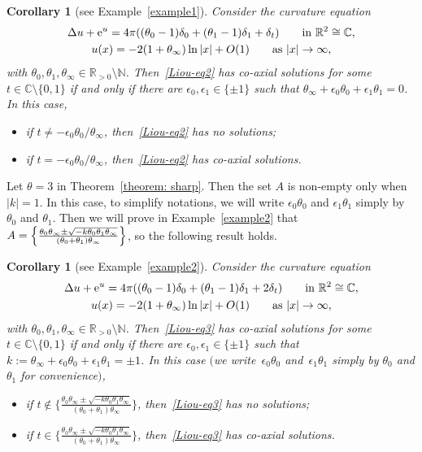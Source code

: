\documentclass[pdftex]{sigma}
\numberwithin{equation}{section}
\newtheorem{Corollary}[Theorem]{Corollary}
\def\C{\mathbb C}
\begin{document}
\begin{Corollary}[see Example~\ref{example1}]
Consider the curvature equation
\begin{gather}
 \Delta u+{\rm e}^u=4\pi((\theta_0-1)\delta_0+(\theta_1-1)\delta_1
 +\delta_{t})
 \qquad\text{in}\ \mathbb R^2\cong\C, \nonumber\\
 u(x)=-2(1+\theta_\infty)\ln|x|+O(1) \qquad \text{as} \
 |x|\to\infty, \label{Liou-eq2}
\end{gather}
with $\theta_0,\theta_1,\theta_\infty\in\mathbb{R}_{>0}\setminus \mathbb{N}$. Then~\eqref{Liou-eq2} has co-axial solutions for some $t\in\mathbb{C}\setminus\{0,1\}$ if and only if there are $\epsilon_0,\epsilon_1\in\{\pm1\}$ such that
 $\theta_\infty+\epsilon_0\theta_0+\epsilon_1\theta_1=0$. In this case,
 \begin{itemize}\itemsep=0pt
 \item[$1)$]if $t\neq -\epsilon_0\theta_0/\theta_\infty$, then~\eqref{Liou-eq2} has no solutions;
 \item[$2)$]if $t= -\epsilon_0\theta_0/\theta_\infty$, then~\eqref{Liou-eq2} has co-axial solutions.
 \end{itemize}
\end{Corollary}

Let $\theta=3$ in Theorem~\ref{theorem: sharp}. Then the set $A$ is non-empty
 only when $|k|=1$. In this case,
 to simplify notations, we will write $\epsilon_0\theta_0$ and
 $\epsilon_1\theta_1$ simply by $\theta_0$ and $\theta_1$. Then we will prove in Example~\ref{example2} that $A=\Bigl\{\frac{\theta_0\theta_\infty
 \pm\sqrt{-k\theta_0\theta_1\theta_\infty}}
 {(\theta_0+\theta_1)\theta_\infty}\Bigr\}$, so the following result holds.

 \begin{Corollary}[see Example~\ref{example2}]
Consider the curvature equation
\begin{gather}
 \Delta u+{\rm e}^u=4\pi((\theta_0-1)\delta_0+(\theta_1-1)\delta_1
 +2\delta_{t})
 \qquad\text{in} \ \mathbb R^2\cong\C, \nonumber\\
 u(x)=-2(1+\theta_\infty)\ln|x|+O(1) \qquad \text{as} \
 |x|\to\infty, \label{Liou-eq3}
\end{gather}
with $\theta_0,\theta_1,\theta_\infty\in\mathbb{R}_{>0}\setminus \mathbb{N}$. Then~\eqref{Liou-eq3} has co-axial solutions for some $t\in\mathbb{C}\setminus\{0,1\}$ if and only if there are $\epsilon_0,\epsilon_1\in\{\pm1\}$ such that
 $k:=\theta_\infty+\epsilon_0\theta_0+\epsilon_1\theta_1=\pm 1$. In this case $($we write~$\epsilon_0\theta_0$ and~$\epsilon_1\theta_1$
 simply by $\theta_0$ and $\theta_1$ for convenience$)$,
 \begin{itemize}\itemsep=0pt
 \item[$1)$]if $t\notin\Big\{\frac{\theta_0\theta_\infty
 \pm\sqrt{-k\theta_0\theta_1\theta_\infty}}
 {(\theta_0+\theta_1)\theta_\infty}\Big\}$, then~\eqref{Liou-eq3} has no solutions;
 \item[$2)$]if $t\in\Big\{ \frac{\theta_0\theta_\infty
 \pm\sqrt{-k\theta_0\theta_1\theta_\infty}}
 {(\theta_0+\theta_1)\theta_\infty}\Big\}$, then~\eqref{Liou-eq3} has co-axial solutions.
 \end{itemize}
\end{Corollary}
\end{document}
